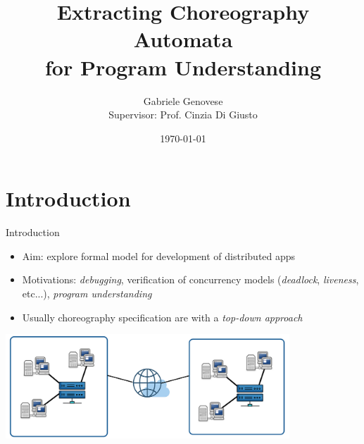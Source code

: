 \documentclass{beamer}
\title{Extracting Choreography Automata \\ for Program Understanding}
\author{Gabriele Genovese \\ Supervisor: Prof. Cinzia Di Giusto}
\date{\today}
\begin{document}
\frame{\titlepage}


\section{Introduction}
\begin{frame}{Introduction}
\begin{itemize}
    \item Aim: explore formal model for development of 
    distributed apps
    \item Motivations: \textit{debugging}, verification of 
    concurrency models (\textit{deadlock}, \textit{liveness}, etc...), 
    \textit{program understanding}
    \item Usually choreography specification are with a \textit{top-down approach}
\end{itemize}
\begin{center}
\includegraphics[width=0.8\textwidth]{images/crop.png}
\end{center}
\end{frame}
\end{document}
